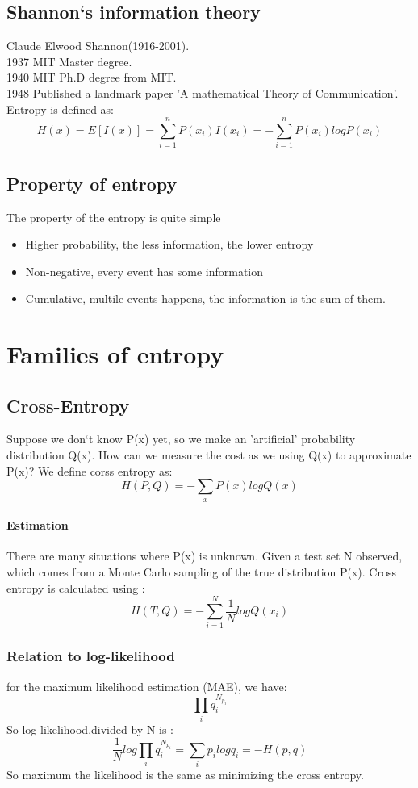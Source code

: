 \documentclass{article}
\begin{document}
\subsection{Shannon`s information theory}
Claude Elwood Shannon(1916-2001).\\
1937 MIT Master degree.\\
1940 MIT Ph.D degree from MIT. \\
1948 Published a landmark paper 'A mathematical Theory of Communication'.\\
Entropy is defined as:
$$H(x)=E[I(x)]=\sum_{i=1}^{n}P(x_{i})I(x_{i})=-\sum_{i=1}^{n}P(x_{i})logP(x_{i})$$
\subsection{Property of entropy}
The property of the entropy is quite simple
\begin{itemize}
\item Higher probability, the less information, the lower entropy
\item Non-negative, every event has some information
\item Cumulative, multile events happens, the information is the sum of them.
\end{itemize}
\section{Families of entropy}
\subsection{Cross-Entropy}
Suppose we don`t know P(x) yet, so we make an 'artificial' probability distribution Q(x). How can we measure the cost as we using Q(x) to approximate P(x)? We define corss entropy as:
$$H(P,Q)=-\sum_{x}P(x)logQ(x)$$

\paragraph{Estimation} There are many situations where P(x) is unknown. Given a test set N observed, which comes from a Monte Carlo sampling of the true distribution P(x). Cross entropy is calculated using :
$$H(T,Q)=-\sum_{i=1}^{N}\frac{1}{N}logQ(x_{i})$$
\subsubsection{Relation to log-likelihood}
for the maximum likelihood estimation (MAE), we have:
$$\prod_{i}q_{i}^{N_{p_{i}}}$$
So log-likelihood,divided by N is :
$$\frac{1}{N}log\prod_{i}q_{i}^{N_{p_{i}}}=\sum_{i}p_{i}logq_{i}=-H(p,q)$$
So maximum the likelihood is the same as minimizing the cross entropy.
\end{document}
